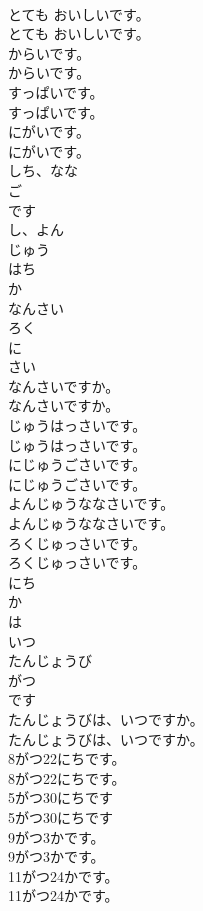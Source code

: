 \documentclass[8pt]{extreport}
\begin{document}
\begin{CJK}{UTF8}{min}
\\	とても おいしいです。	
\\	とても おいしいです。 
\\	からいです。	
\\	からいです。 
\\	すっぱいです。	
\\	すっぱいです。 
\\	にがいです。	
\\	にがいです。 
\\	しち、なな
\\	ご
\\	です
\\	し、よん
\\	じゅう
\\	はち
\\	か
\\	なんさい
\\	ろく
\\	に
\\	さい
\\	なんさいですか。	
\\	なんさいですか。 
\\	じゅうはっさいです。	
\\	じゅうはっさいです。 
\\	にじゅうごさいです。	
\\	にじゅうごさいです。 
\\	よんじゅうななさいです。	
\\	よんじゅうななさいです。 
\\	ろくじゅっさいです。	
\\	ろくじゅっさいです。 
\\	にち
\\	か
\\	は
\\	いつ
\\	たんじょうび
\\	がつ
\\	です
\\	たんじょうびは、いつですか。	
\\	たんじょうびは、いつですか。 
\\	8がつ22にちです。	
\\	8がつ22にちです。 
\\	5がつ30にちです	
\\	5がつ30にちです 
\\	9がつ3かです。	
\\	9がつ3かです。 
\\	11がつ24かです。	
\\	11がつ24かです。 

\end{CJK}
\end{document}
